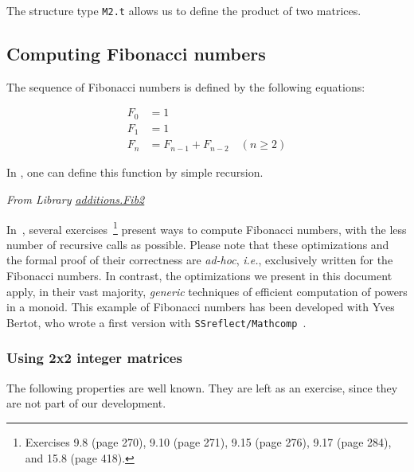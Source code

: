 

The structure type \texttt{M2.t} allows us to define the product
of two matrices. 


\subsection{Computing Fibonacci numbers}

The sequence of Fibonacci numbers is defined by the following equations:

\begin{align}
F_0 & = 1 \\
F_1 & = 1 \\
F_n & = F_{n-1} + F_{n-2} \quad (n \geq 2)
\end{align}


In \coq{}, one can define this function by simple recursion.

\emph{From Library
\href{../theories/html/additions.Fib2.html}{additions.Fib2}}


In~\cite{BC04}, several exercises~\footnote{Exercises 9.8 (page 270), 9.10 (page 271), 9.15 (page 276), 9.17 (page 284), and 15.8 (page 418).}
present ways to compute Fibonacci numbers, with the less number of recursive calls  as possible. Please note that these optimizations and the formal proof of their correctness are \emph{ad-hoc}, \emph{i.e.}, exclusively written for the
Fibonacci numbers.
In contrast, the optimizations we present in this document apply, in their vast majority, \emph{generic} techniques of efficient computation of powers in a monoid. 
This example of Fibonacci numbers has been developed with Yves Bertot, who wrote a first version with \texttt{SSreflect/Mathcomp}~\cite{MCB}.


\subsubsection{Using 2x2 integer matrices}

The following properties are well known. They are left as an exercise, since they are not part of our development. 

